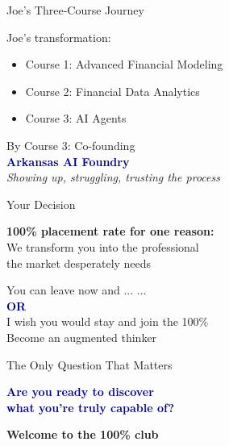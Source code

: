 \documentclass[aspectratio=169,12pt]{beamer}
\begin{document}
\begin{frame}{Joe's Three-Course Journey}
\begin{center}
\footnotesize
Joe's transformation:\\
\vspace{0.1cm}
\begin{itemize}
\item Course 1: Advanced Financial Modeling\\
\item Course 2: Financial Data Analytics\\
\item Course 3: AI Agents\\
\end{itemize}
\vspace{0.1cm}
By Course 3: Co-founding\\
\textcolor{darkblue}{\textbf{Arkansas AI Foundry}}\\
\vspace{0.1cm}
\textit{Showing up, struggling, trusting the process}
\end{center}
\end{frame}

\begin{frame}{Your Decision}
\begin{center}
\normalsize
\textbf{100\% placement rate for one reason:}\\
\vspace{0.2cm}
We transform you into the professional\\
the market desperately needs

\vspace{0.3cm}
\small
You can leave now and ... ... \\
\vspace{0.2cm}
\large
\textcolor{darkblue}{\textbf{OR}}\\
\vspace{0.2cm}
\small
I wish you would stay and join the 100\%\\
Become an augmented thinker
\end{center}
\end{frame}

\begin{frame}{The Only Question That Matters}
\begin{center}
\normalsize
\textcolor{darkblue}{\textbf{Are you ready to discover\\
what you're truly capable of?}}

\vspace{0.2cm}
\footnotesize
\textcolor{successgreen}{\textbf{Welcome to the 100\% club}}
\end{center}
\end{frame}
\end{document}
